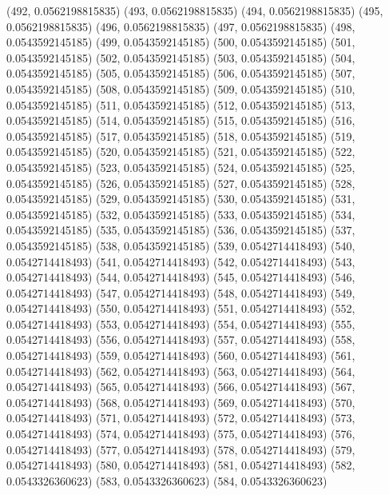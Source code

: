 {					(492, 0.0562198815835)
					(493, 0.0562198815835)
					(494, 0.0562198815835)
					(495, 0.0562198815835)
					(496, 0.0562198815835)
					(497, 0.0562198815835)
					(498, 0.0543592145185)
					(499, 0.0543592145185)
					(500, 0.0543592145185)
					(501, 0.0543592145185)
					(502, 0.0543592145185)
					(503, 0.0543592145185)
					(504, 0.0543592145185)
					(505, 0.0543592145185)
					(506, 0.0543592145185)
					(507, 0.0543592145185)
					(508, 0.0543592145185)
					(509, 0.0543592145185)
					(510, 0.0543592145185)
					(511, 0.0543592145185)
					(512, 0.0543592145185)
					(513, 0.0543592145185)
					(514, 0.0543592145185)
					(515, 0.0543592145185)
					(516, 0.0543592145185)
					(517, 0.0543592145185)
					(518, 0.0543592145185)
					(519, 0.0543592145185)
					(520, 0.0543592145185)
					(521, 0.0543592145185)
					(522, 0.0543592145185)
					(523, 0.0543592145185)
					(524, 0.0543592145185)
					(525, 0.0543592145185)
					(526, 0.0543592145185)
					(527, 0.0543592145185)
					(528, 0.0543592145185)
					(529, 0.0543592145185)
					(530, 0.0543592145185)
					(531, 0.0543592145185)
					(532, 0.0543592145185)
					(533, 0.0543592145185)
					(534, 0.0543592145185)
					(535, 0.0543592145185)
					(536, 0.0543592145185)
					(537, 0.0543592145185)
					(538, 0.0543592145185)
					(539, 0.0542714418493)
					(540, 0.0542714418493)
					(541, 0.0542714418493)
					(542, 0.0542714418493)
					(543, 0.0542714418493)
					(544, 0.0542714418493)
					(545, 0.0542714418493)
					(546, 0.0542714418493)
					(547, 0.0542714418493)
					(548, 0.0542714418493)
					(549, 0.0542714418493)
					(550, 0.0542714418493)
					(551, 0.0542714418493)
					(552, 0.0542714418493)
					(553, 0.0542714418493)
					(554, 0.0542714418493)
					(555, 0.0542714418493)
					(556, 0.0542714418493)
					(557, 0.0542714418493)
					(558, 0.0542714418493)
					(559, 0.0542714418493)
					(560, 0.0542714418493)
					(561, 0.0542714418493)
					(562, 0.0542714418493)
					(563, 0.0542714418493)
					(564, 0.0542714418493)
					(565, 0.0542714418493)
					(566, 0.0542714418493)
					(567, 0.0542714418493)
					(568, 0.0542714418493)
					(569, 0.0542714418493)
					(570, 0.0542714418493)
					(571, 0.0542714418493)
					(572, 0.0542714418493)
					(573, 0.0542714418493)
					(574, 0.0542714418493)
					(575, 0.0542714418493)
					(576, 0.0542714418493)
					(577, 0.0542714418493)
					(578, 0.0542714418493)
					(579, 0.0542714418493)
					(580, 0.0542714418493)
					(581, 0.0542714418493)
					(582, 0.0543326360623)
					(583, 0.0543326360623)
					(584, 0.0543326360623)
}

